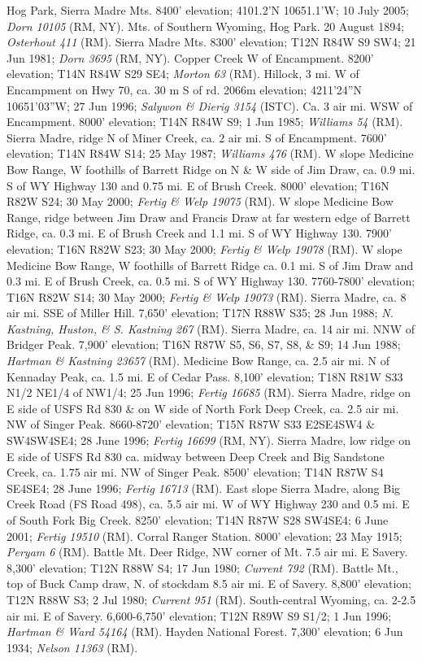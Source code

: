 Hog Park, Sierra Madre Mts. 8400’ elevation; 4101.2’N 10651.1’W; 10 July 2005; \textit{Dorn 10105} (RM, NY).  Mts. of Southern Wyoming, Hog Park. 20 August 1894; \textit{Osterhout 411} (RM).  Sierra Madre Mts. 8300’ elevation; T12N R84W S9 SW4; 21 Jun 1981; \textit{Dorn 3695} (RM, NY).  Copper Creek W of Encampment. 8200’ elevation; T14N R84W S29 SE4; \textit{Morton 63} (RM).  Hillock, 3 mi. W of Encampment on Hwy 70, ca. 30 m S of rd. 2066m elevation; 4211’24”N 10651’03”W; 27 Jun 1996; \textit{Salywon \& Dierig 3154} (ISTC).  Ca. 3 air mi. WSW of Encampment. 8000’ elevation; T14N R84W S9; 1 Jun 1985; \textit{Williams 54} (RM).  Sierra Madre, ridge N of Miner Creek, ca. 2 air mi. S of Encampment. 7600’ elevation; T14N R84W S14; 25 May 1987; \textit{Williams 476} (RM).  W slope Medicine Bow Range, W foothills of Barrett Ridge on N \& W side of Jim Draw, ca. 0.9 mi. S of WY Highway 130 and 0.75 mi. E of Brush Creek. 8000’ elevation; T16N R82W S24; 30 May 2000; \textit{Fertig \& Welp 19075} (RM).  W slope Medicine Bow Range, ridge between Jim Draw and Francis Draw at far western edge of Barrett Ridge, ca. 0.3 mi. E of Brush Creek and 1.1 mi. S of WY Highway 130. 7900’ elevation; T16N R82W S23; 30 May 2000; \textit{Fertig \& Welp 19078} (RM).  W slope Medicine Bow Range, W foothills of Barrett Ridge ca. 0.1 mi. S of Jim Draw and 0.3 mi. E of Brush Creek, ca. 0.5 mi. S of WY Highway 130. 7760-7800’ elevation; T16N R82W S14; 30 May 2000; \textit{Fertig \& Welp 19073} (RM).  Sierra Madre, ca. 8 air mi. SSE of Miller Hill.  7,650’ elevation; T17N R88W S35; 28 Jun 1988; \textit{N. Kastning, Huston, \& S. Kastning 267} (RM).    Sierra Madre, ca. 14 air mi. NNW of Bridger Peak.  7,900’ elevation; T16N R87W S5, S6, S7, S8, \& S9; 14 Jun 1988; \textit{Hartman \& Kastning 23657} (RM).  Medicine Bow Range, ca. 2.5 air mi. N of Kennaday Peak, ca. 1.5 mi. E of Cedar Pass. 8,100’ elevation; T18N R81W S33 N1/2 NE1/4 of NW1/4; 25 Jun 1996; \textit{Fertig 16685} (RM).  Sierra Madre, ridge on E side of USFS Rd 830 \& on W side of North Fork Deep Creek, ca. 2.5 air mi. NW of Singer Peak. 8660-8720’ elevation; T15N R87W S33 E2SE4SW4 \& SW4SW4SE4; 28 June 1996; \textit{Fertig 16699} (RM, NY).  Sierra Madre, low ridge on E side of USFS Rd 830 ca. midway between Deep Creek and Big Sandstone Creek, ca. 1.75 air mi. NW of Singer Peak. 8500’ elevation; T14N R87W S4 SE4SE4; 28 June 1996; \textit{Fertig 16713} (RM).   East slope Sierra Madre, along Big Creek Road (FS Road 498), ca. 5.5 air mi. W of WY Highway 230 and 0.5 mi. E of South Fork Big Creek. 8250’ elevation; T14N R87W S28 SW4SE4; 6 June 2001; \textit{Fertig 19510} (RM).   Corral Ranger Station. 8000’ elevation; 23 May 1915; \textit{Peryam 6} (RM).  Battle Mt. Deer Ridge, NW corner of Mt.  7.5 air mi. E Savery.  8,300’ elevation; T12N R88W S4; 17 Jun 1980; \textit{Current 792} (RM).  Battle Mt., top of Buck Camp draw, N. of stockdam 8.5 air mi. E of Savery.  8,800’ elevation; T12N R88W S3; 2 Jul 1980; \textit{Current 951} (RM).  South-central Wyoming, ca. 2-2.5 air mi. E of Savery.  6,600-6,750’ elevation; T12N R89W S9 S1/2; 1 Jun 1996; \textit{Hartman \& Ward 54164} (RM).  Hayden National Forest.  7,300' elevation; 6 Jun 1934; \textit{Nelson 11363} (RM).  

